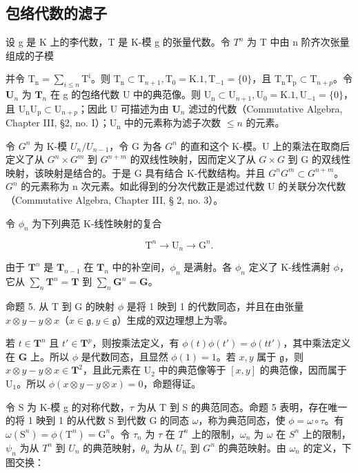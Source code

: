 \subsection{包络代数的滤子}

设 g 是 K 上的李代数，T 是 K-模 g 的张量代数。令 \(T^{n}\) 为 T 中由 n 阶齐次张量组成的子模

并令 \(\mathrm{T_n} = \sum_{i\leqslant n}\mathrm{T^i}\)。则 \(\mathrm{T_n}\subset \mathrm{T}_{n + 1},\mathrm{T_0} = \mathrm{K}.1,\mathrm{T}_{-1} = \{0\}\)，且 \(\mathrm{T_nT_p}\subset \mathrm{T}_{n + p}\)。令 \(\mathbf{U}_n\) 为 \(\mathbf{T}_n\) 在 g 的包络代数 U 中的典范像。则 \(\mathrm{U_n}\subset \mathrm{U}_{n + 1},\mathrm{U_0} = \mathrm{K}.1,\mathrm{U}_{-1} = \{0\}\)，且 \(\mathrm{U_nU_p}\subset \mathrm{U}_{n + p}\)；因此 U 可描述为由 \(\mathbf{U}_n\) 滤过的代数（Commutative Algebra, Chapter III, §2, no. I）；\(\mathrm{U_n}\) 中的元素称为滤子次数 \(\leqslant n\) 的元素。

令 \(G^n\) 为 K-模 \(U_n / U_{n-1}\)，令 G 为各 \(G^n\) 的直和这个 K-模。U 上的乘法在取商后定义了从 \(G^n \times G^m\) 到 \(G^{n+m}\) 的双线性映射，因而定义了从 \(G \times G\) 到 G 的双线性映射，该映射是结合的。于是 G 具有结合 K-代数结构。并且 \(G^n G^m \subset G^{n+m}\)。\(G^n\) 的元素称为 n 次元素。如此得到的分次代数正是滤过代数 U 的关联分次代数（Commutative Algebra, Chapter III, § 2, no. 3）。

令 \(\phi_{n}\) 为下列典范 K-线性映射的复合

\[
\mathrm{T} ^ {n} \rightarrow \mathrm{U} _ {n} \rightarrow \mathrm{G} ^ {n}.
\]

由于 \(\mathbf{T}^n\) 是 \(\mathbf{T}_{n - 1}\) 在 \(\mathbf{T}_n\) 中的补空间，\(\phi_n\) 是满射。各 \(\phi_n\) 定义了 K-线性满射 \(\phi\)，它从 \(\sum_{n}\mathbf{T}^{n} = \mathbf{T}\) 到 \(\sum_{n}\mathbf{G}^{n} = \mathbf{G}\)。

命题 5. 从 T 到 G 的映射 \(\phi\) 是将 1 映到 1 的代数同态，并且在由张量 \(x \otimes y - y \otimes x\)（\(x \in \mathfrak{g}, y \in \mathfrak{g}\)）生成的双边理想上为零。

若 \(t \in \mathbf{T}^n\) 且 \(t' \in \mathbf{T}^p\)，则按乘法定义，有 \(\phi(t)\phi(t') = \phi(tt')\)，其中乘法定义在 \(\mathbf{G}\) 上。所以 \(\phi\) 是代数同态，且显然 \(\phi(1) = 1\)。若 \(x, y\) 属于 \(\mathfrak{g}\)，则 \(x \otimes y - y \otimes x \in \mathbf{T}^2\)，且此元素在 \(\mathrm{U}_2\) 中的典范像等于 \([x, y]\) 的典范像，因而属于 \(\mathrm{U}_1\)。所以 \(\phi(x \otimes y - y \otimes x) = 0\)，命题得证。

令 S 为 K-模 g 的对称代数，\(\tau\) 为从 T 到 S 的典范同态。命题 5 表明，存在唯一的将 1 映到 1 的从代数 S 到代数 G 的同态 \(\omega\)，称为典范同态，使 \(\phi = \omega \circ \tau\)。有 \(\omega(\mathrm{S}^{n}) = \phi(\mathrm{T}^{n}) = \mathrm{G}^{n}\)。令 \(\tau_{n}\) 为 \(\tau\) 在 \(T^{n}\) 上的限制，\(\omega_{n}\) 为 \(\omega\) 在 \(S^{n}\) 上的限制，\(\psi_{n}\) 为从 \(T^{n}\) 到 \(U_{n}\) 的典范映射，\(\theta_{n}\) 为从 \(U_{n}\) 到 \(G^{n}\) 的典范映射。由 \(\omega_{n}\) 的定义，下图交换：

